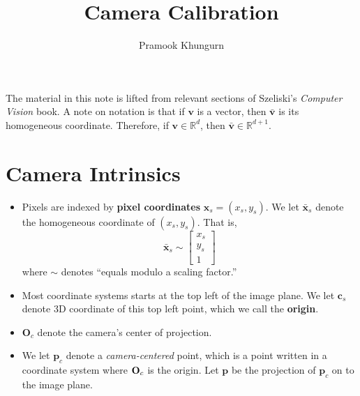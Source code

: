 \documentclass[10pt]{article}
\title{Camera Calibration}
\author{Pramook Khungurn}
\newcommand{\ve}[1]{\mathbf{#1}}
\begin{document}
	\maketitle
	
	The material in this note is lifted from relevant sections of 
	Szeliski's \emph{Computer Vision} book. A note on notation
	is that if $\ve{v}$ is a vector, then $\bar{\ve{v}}$ is its homogeneous
	coordinate. Therefore, if $\ve{v} \in \mathbb{R}^d$,
	then $\bar{\ve{v}} \in \mathbb{R}^{d+1}.$
	
	\section{Camera Intrinsics} %
	
	\begin{itemize}
	  \item Pixels are indexed by {\bf pixel coordinates} $\ve{x}_s = (x_s, y_s)$.
	    We let $\bar{\ve{x}}_s$ denote the homogeneous coordinate of $(x_s, y_s)$.
	    That is, $$\bar{\ve{x}}_s \sim \begin{bmatrix}x_s \\ y_s \\ 1\end{bmatrix}$$
	    where $\sim$ denotes ``equals modulo a scaling factor.''	  	  
	  
	  \item Most coordinate systems starts at the top left of the image plane. We let $\ve{c}_s$ denote
	    3D coordinate of this top left point, which we call the {\bf origin}.
	    
    \item $\ve{O}_c$ denote the camera's center of projection.	    
    	  
	  \item We let $\ve{p}_c$ denote a \emph{camera-centered} point, which is a point
	    written in a coordinate system where ${\bf O}_c$ is the origin.  Let $\ve{p}$ be the 
	    projection of $\ve{p}_c$ on to the image plane.
	  

\end{itemize}
\end{document}
